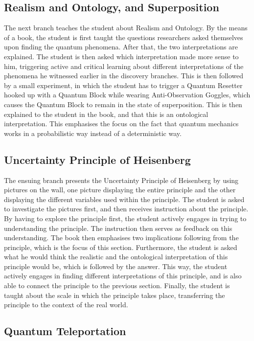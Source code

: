 \documentclass[11pt,twoside]{report} %
\begin{document}
\subsection{Realism and Ontology, and Superposition}

The next branch teaches the student about Realism and Ontology. By the means of a book, the student is first taught the questions researchers asked themselves upon finding the quantum phenomena. After that, the two interpretations are explained. The student is then asked which interpretation made more sense to him, triggering active and critical learning about different interpretations of the phenomena he witnessed earlier in the discovery branches. This is then followed by a small experiment, in which the student has to trigger a Quantum Resetter hooked up with a Quantum Block while wearing Anti-Observation Goggles, which causes the Quantum Block to remain in the state of superposition. This is then explained to the student in the book, and that this is an ontological interpretation. This emphasises the focus on the fact that quantum mechanics works in a probabilistic way instead of a deterministic way.

\subsection{Uncertainty Principle of Heisenberg}

The ensuing branch presents the Uncertainty Principle of Heisenberg by using pictures on the wall, one picture displaying the entire principle and the other displaying the different variables used within the principle. The student is asked to investigate the pictures first, and then receives instruction about the principle. By having to explore the principle first, the student actively engages in trying to understanding the principle. The instruction then serves as feedback on this understanding. The book then emphasises two implications following from the principle, which is the focus of this section. Furthermore, the student is asked what he would think the realistic and the ontological interpretation of this principle would be, which is followed by the answer. This way, the student actively engages in finding different interpretations of this principle, and is also able to connect the principle to the previous section. Finally, the student is taught about the scale in which the principle takes place, transferring the principle to the context of the real world.

\subsection{Quantum Teleportation}
\end{document}
